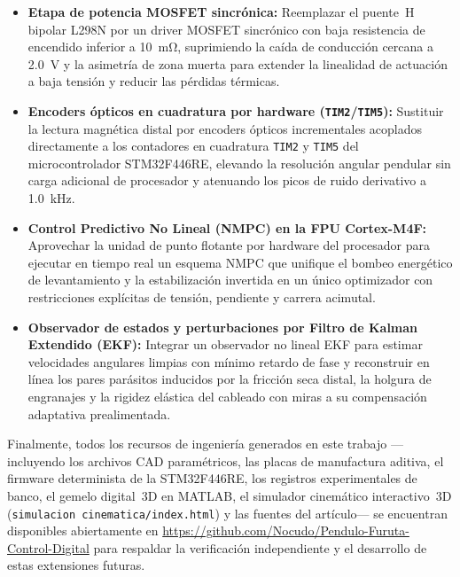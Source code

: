 \begin{itemize}
    \item \textbf{Etapa de potencia MOSFET sincrónica:} Reemplazar el puente~H bipolar L298N por un driver MOSFET sincrónico con baja resistencia de encendido inferior a \qty{10}{\milli\ohm}, suprimiendo la caída de conducción cercana a \qty{2.0}{\volt} y la asimetría de zona muerta para extender la linealidad de actuación a baja tensión y reducir las pérdidas térmicas.
    \item \textbf{Encoders ópticos en cuadratura por hardware (\texttt{TIM2}/\texttt{TIM5}):} Sustituir la lectura magnética distal por encoders ópticos incrementales acoplados directamente a los contadores en cuadratura \texttt{TIM2} y \texttt{TIM5} del microcontrolador STM32F446RE, elevando la resolución angular pendular sin carga adicional de procesador y atenuando los picos de ruido derivativo a \qty{1.0}{\kilo\hertz}.
    \item \textbf{Control Predictivo No Lineal (NMPC) en la FPU Cortex-M4F:} Aprovechar la unidad de punto flotante por hardware del procesador para ejecutar en tiempo real un esquema NMPC que unifique el bombeo energético de levantamiento y la estabilización invertida en un único optimizador con restricciones explícitas de tensión, pendiente y carrera acimutal.
    \item \textbf{Observador de estados y perturbaciones por Filtro de Kalman Extendido (EKF):} Integrar un observador no lineal EKF para estimar velocidades angulares limpias con mínimo retardo de fase y reconstruir en línea los pares parásitos inducidos por la fricción seca distal, la holgura de engranajes y la rigidez elástica del cableado con miras a su compensación adaptativa prealimentada.
\end{itemize}

Finalmente, todos los recursos de ingeniería generados en este trabajo ---incluyendo los archivos CAD paramétricos, las placas de manufactura aditiva, el firmware determinista de la STM32F446RE, los registros experimentales de banco, el gemelo digital~3D en MATLAB, el simulador cinemático interactivo~3D (\texttt{simulacion cinematica/\allowbreak index.html}) y las fuentes del artículo--- se encuentran disponibles abiertamente en \url{https://github.com/Nocudo/Pendulo-Furuta-Control-Digital} para respaldar la verificación independiente y el desarrollo de estas extensiones futuras.

